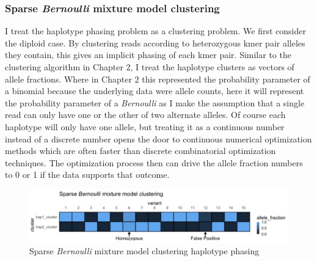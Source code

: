 \subsubsection{Sparse \textit{Bernoulli} mixture model clustering}

\par{
I treat the haplotype phasing problem as a clustering problem. We first consider the diploid case. By clustering reads according to heterozygous kmer pair alleles they contain, this gives an implicit phasing of each kmer pair. Similar to the clustering algorithm in Chapter 2, I treat the haplotype clusters as vectors of allele fractions. Where in Chapter 2 this represented the probability parameter of a binomial because the underlying data were allele counts, here it will represent the probability parameter of a \textit{Bernoulli} as I make the assumption that a single read can only have one or the other of two alternate alleles. Of course each haplotype will only have one allele, but treating it as a continuous number instead of a discrete number opens the door to continuous numerical optimization methods which are often faster than discrete combinatorial optimization techniques. The optimization process then can drive the allele fraction numbers to 0 or 1 if the data supports that outcome. \\
} 

\begin{figure}[htbp!]
\caption{Sparse \textit{Bernoulli} mixture model clustering haplotype phasing}
\label{figure:scaff}
\begin{centering}
\includegraphics[width=\textwidth]{sparsebernoulli.png}
\end{centering}
\end{figure}

